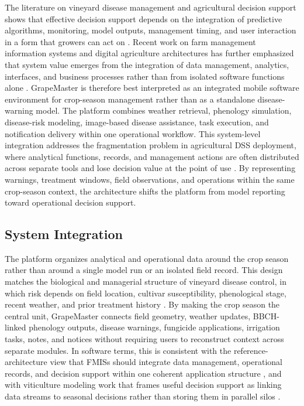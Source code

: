 \documentclass[11pt,a4paper]{article}
\begin{document}
The literature on vineyard disease management and agricultural decision support shows that effective decision support depends on the integration of predictive algorithms, monitoring, model outputs, management timing, and user interaction in a form that growers can act on \citep{McCown2002DSSComplexity,Rose2016DecisionSupportTools,Rossi2014ViteNet}. Recent work on farm management information systems and digital agriculture architectures has further emphasized that system value emerges from the integration of data management, analytics, interfaces, and business processes rather than from isolated software functions alone \citep{Tummers2021ReferenceArchitecture,Uyar2024DataValue}. GrapeMaster is therefore best interpreted as an integrated mobile software environment for crop-season management rather than as a standalone disease-warning model. The platform combines weather retrieval, phenology simulation, disease-risk modeling, image-based disease assistance, task execution, and notification delivery within one operational workflow. This system-level integration addresses the fragmentation problem in agricultural DSS deployment, where analytical functions, records, and management actions are often distributed across separate tools and lose decision value at the point of use \citep{Fountas2015FMIS,Tummers2019FMISReview}. By representing warnings, treatment windows, field observations, and operations within the same crop-season context, the architecture shifts the platform from model reporting toward operational decision support.

\subsection{System Integration}

The platform organizes analytical and operational data around the crop season rather than around a single model run or an isolated field record. This design matches the biological and managerial structure of vineyard disease control, in which risk depends on field location, cultivar susceptibility, phenological stage, recent weather, and prior treatment history \citep{Peng2024DownyMildew,Puelles2024DownyMildewModels}. By making the crop season the central unit, GrapeMaster connects field geometry, weather updates, BBCH-linked phenology outputs, disease warnings, fungicide applications, irrigation tasks, notes, and notices without requiring users to reconstruct context across separate modules. In software terms, this is consistent with the reference-architecture view that FMISs should integrate data management, operational records, and decision support within one coherent application structure \citep{Tummers2021ReferenceArchitecture}, and with viticulture modeling work that frames useful decision support as linking data streams to seasonal decisions rather than storing them in parallel silos \citep{Knowling2021ViticultureModels}.
\end{document}
